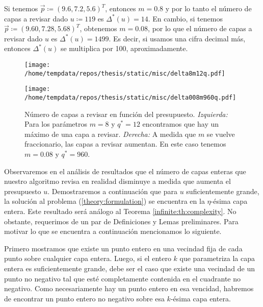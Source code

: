 \begin{example}
	\label{ex:decimals}
	Si tenemos $\vec{p} \coloneq (9.6, 7.2, 5.6)^T$, entonces $m = 0.8$ y por lo tanto el número de
	capas a revisar dado $u \coloneq 119$ es $\Delta^*(u) = 14$. En cambio, si tenemos $\vec{p} \coloneq
	(9.60, 7.28, 5.68)^T$, obtenemos $m = 0.08$, por lo que el número de capas a revisar dado $u$ es
	$\Delta^*(u) = 1499$. Es decir, si usamos una cifra decimal más, entonces $\Delta^*(u)$ se
	multiplica por 100, aproximadamente.
\end{example}

\begin{figure}[htbp]
  \centering

  \begin{minipage}[t]{0.48\textwidth}
    \centering
    \texttt{[image: /home/tempdata/repos/thesis/static/misc/delta8m12q.pdf]}
  \end{minipage}
  \hfill
  \begin{minipage}[t]{0.48\textwidth}
    \centering
    \texttt{[image: /home/tempdata/repos/thesis/static/misc/delta008m960q.pdf]}
  \end{minipage}

  \caption{Número de capas a revisar en función del presupuesto. \textit{Izquierda: }Para los
	  parámetros $m = 8$ y $q^* = 12$ encontramos que hay un máximo de una capa a revisar.
	\textit{Derecha: } A medida que $m$ se vuelve fraccionario, las capas a revisar aumentan. En
		este caso tenemos $m = 0.08$ y $q^* = 960$.}
  \label{fig:m:ex}
\end{figure}

Observaremos en el análisis de resultados que el número de capas enteras que nuestro algoritmo
revisa en realidad disminuye a medida que aumenta el presupuesto $u$. Demostraremos a continuación
que para $u$ suficientemente grande, la solución al problema (\ref{theory:formulation}) se encuentra
en la $\eta$-ésima capa entera. Este resultado será análogo al Teorema \ref{infinite:th:complexity}.
No obstante, requerimos de un par de Definiciones y Lemas preliminares. Para motivar lo que
se encuentra a continuación mencionamos lo siguiente.

Primero mostramos que existe un punto entero en una vecindad fija de cada punto sobre cualquier capa
entera. Luego, si el entero $k$ que parametriza la capa entera es suficientemente grande, debe ser
el caso que existe una vecindad de un punto no negativo tal que esté completamente contenida en el
cuadrante no negativo. Como necesariamente hay un punto entero en esa vencidad, habremos de
encontrar un punto entero no negativo sobre esa $k$-ésima capa entera.

